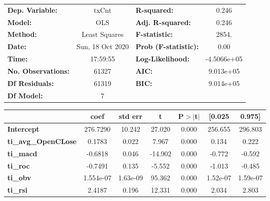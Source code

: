 \begin{center}
\begin{tabular}{lclc}
\toprule
\textbf{Dep. Variable:}     &      txCnt       & \textbf{  R-squared:         } &      0.246   \\
\textbf{Model:}             &       OLS        & \textbf{  Adj. R-squared:    } &      0.246   \\
\textbf{Method:}            &  Least Squares   & \textbf{  F-statistic:       } &      2854.   \\
\textbf{Date:}              & Sun, 18 Oct 2020 & \textbf{  Prob (F-statistic):} &      0.00    \\
\textbf{Time:}              &     17:59:55     & \textbf{  Log-Likelihood:    } & -4.5066e+05  \\
\textbf{No. Observations:}  &       61327      & \textbf{  AIC:               } &  9.013e+05   \\
\textbf{Df Residuals:}      &       61319      & \textbf{  BIC:               } &  9.014e+05   \\
\textbf{Df Model:}          &           7      & \textbf{                     } &              \\
\bottomrule
\end{tabular}
\begin{tabular}{lcccccc}
                            & \textbf{coef} & \textbf{std err} & \textbf{t} & \textbf{P$> |$t$|$} & \textbf{[0.025} & \textbf{0.975]}  \\
\midrule
\textbf{Intercept}          &     276.7290  &       10.242     &    27.020  &         0.000        &      256.655    &      296.803     \\
\textbf{ti\_avg\_OpenCLose} &       0.1783  &        0.022     &     7.967  &         0.000        &        0.134    &        0.222     \\
\textbf{ti\_macd}           &      -0.6818  &        0.046     &   -14.902  &         0.000        &       -0.772    &       -0.592     \\
\textbf{ti\_roc}            &      -0.7491  &        0.135     &    -5.552  &         0.000        &       -1.013    &       -0.485     \\
\textbf{ti\_obv}            &    1.554e-07  &     1.63e-09     &    95.362  &         0.000        &     1.52e-07    &     1.59e-07     \\
\textbf{ti\_rsi}            &       2.4187  &        0.196     &    12.331  &         0.000        &        2.034    &        2.803     \\

\end{tabular}
\end{center}
